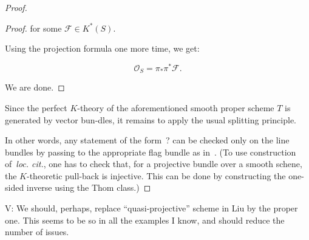 \documentclass[12pt]{amsart}
\theoremstyle{definition}
\newcommand{\1}{\mathbf 1}
\newcommand{\vcomment}[1]{{\color{red}V: #1}}
\begin{document}
\begin{proof}
\begin{proof}
for some $\mathcal F \in K^*(S)$.

Using the projection formula one more time, we get:

$$\mathcal O_S = \pi_*\pi^*\mathcal F.$$

We are done.
\end{proof}

Since the perfect $K$-theory of the aforementioned smooth  proper scheme $T$ is generated by vector bun-dles, it remains to apply the usual splitting principle.

In other words, any statement of the form~? can be checked only on the line bundles by passing to the appropriate flag bundle as in~\cite[Subsection 3.2]{Fulton}. (To use construction of~\textit{loc. cit.}, one has to check that, for a projective bundle over a smooth schene, the $K$-theoretic pull-back is injective. This can be done by constructing the one-sided inverse using the Thom class.)
\end{proof}

\vcomment{We should, perhaps, replace ``quasi-projective'' scheme in Liu by the proper one. This seems to be so in all the examples I know, and should reduce the number of issues.}
\fi





\end{document}
